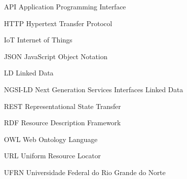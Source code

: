 \begin{siglas}
   \item[API] Application Programming Interface 
    \item[HTTP] Hypertext Transfer Protocol
    \item[IoT] Internet of Things
    \item[JSON] JavaScript Object Notation
    \item[LD] Linked Data
    \item[NGSI-LD] Next Generation Services Interfaces Linked Data
    \item[REST] Representational State Transfer 
    \item[RDF] Resource Description Framework
    \item[OWL] Web Ontology Language
    \item[URL] Uniform Resource Locator
    \item[UFRN] Universidade Federal do Rio Grande do Norte
\end{siglas}